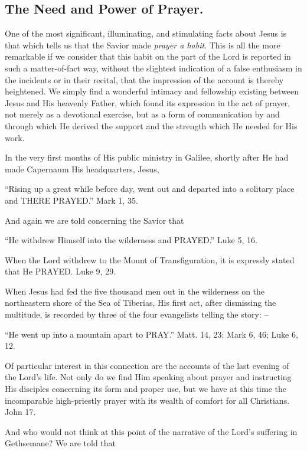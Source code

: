 \documentclass[
]{book}
\begin{document}
\subsection*{The Need and Power of Prayer.}\label{the-need-and-power-of-prayer.}

One of the most significant, illuminating, and stimulating facts about Jesus is that which tells us that the Savior made \emph{prayer a habit}. This is all the more remarkable if we consider that this habit on the part of the Lord is reported in such a matter-of-fact way, without the slightest indication of a false enthusiasm in the incidents or in their recital, that the impression of the account is thereby heightened. We simply find a wonderful intimacy and fellowship existing between Jesus and His heavenly Father, which found its expression in the act of prayer, not merely as a devotional exercise, but as a form of communication by and through which He derived the support and the strength which He needed for His work.

In the very first months of His public ministry in Galilee, shortly after He had made Capernaum His headquarters, Jesus,

``Rising up a great while before day, went out and departed into a solitary place and THERE PRAYED.'' Mark 1, 35.

And again we are told concerning the Savior that

``He withdrew Himself into the wilderness and PRAYED.'' Luke 5, 16.

When the Lord withdrew to the Mount of Transfiguration, it is expressly stated that He PRAYED. Luke 9, 29.

When Jesus had fed the five thousand men out in the wilderness on the northeastern shore of the Sea of Tiberias, His first act, after dismissing the multitude, is recorded by three of the four evangelists telling the story: --

``He went up into a mountain apart to PRAY.'' Matt. 14, 23; Mark 6, 46; Luke 6, 12.

Of particular interest in this connection are the accounts of the last evening of the Lord's life. Not only do we find Him speaking about prayer and instructing His disciples concerning its form and proper use, but we have at this time the incomparable high-priestly prayer with its wealth of comfort for all Christians. John 17.

And who would not think at this point of the narrative of the Lord's suffering in Gethsemane? We are told that
\end{document}
